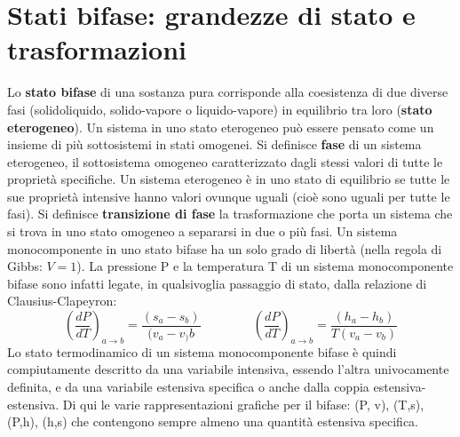 \section{Stati bifase: grandezze di stato e trasformazioni}
Lo \textbf{stato bifase} di una sostanza pura corrisponde alla coesistenza di due diverse fasi (solidoliquido, solido-vapore o liquido-vapore) in equilibrio tra loro (\textbf{stato eterogeneo}). Un sistema
in uno stato eterogeneo può essere pensato come un insieme di più sottosistemi in stati
omogenei. Si definisce \textbf{fase} di un sistema eterogeneo, il sottosistema omogeneo caratterizzato
dagli stessi valori di tutte le proprietà specifiche. Un sistema eterogeneo è in uno stato di
equilibrio se tutte le sue proprietà intensive hanno valori ovunque uguali (cioè sono uguali
per tutte le fasi). \newline
\newline
Si definisce \textbf{transizione di fase} la trasformazione che porta un sistema che si trova in uno
stato omogeneo a separarsi in due o più fasi.\newline
\newline
Un sistema monocomponente in uno stato bifase
ha un solo grado di libertà (nella regola di Gibbs: $V=1$). \newline
\newline
La pressione P e la temperatura T di un sistema monocomponente bifase sono infatti legate,
in qualsivoglia passaggio di stato, dalla relazione di Clausius-Clapeyron: 
\[
    \left(\frac{dP}{dT}\right)_{a \rightarrow b} = \frac{(s_a-s_b)}{(v_a-v_)b} \;\;\;\;\;\;\;\;\;\;\;\;\;\;\; \left( \frac{dP}{dT} \right)_{a \rightarrow  b} = \frac{(h_a-h_b)}{T(v_a-v_b)}
\]
Lo stato termodinamico di un sistema monocomponente bifase è quindi compiutamente
descritto da una variabile intensiva, essendo l'altra univocamente definita, e da una variabile
estensiva specifica o anche dalla coppia estensiva-estensiva. \newline
\newline
Di qui le varie rappresentazioni grafiche per il bifase: (P, v), (T,s), (P,h), (h,s) che contengono
sempre almeno una quantità estensiva specifica. 
